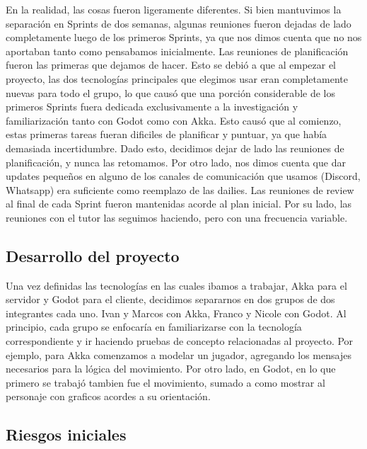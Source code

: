 En la realidad, las cosas fueron ligeramente diferentes. Si bien mantuvimos la separación en Sprints de dos semanas, algunas reuniones
fueron dejadas de lado completamente luego de los primeros Sprints, ya que nos dimos cuenta que no nos aportaban tanto como pensabamos
inicialmente.
Las reuniones de planificación fueron las primeras que dejamos de hacer. Esto se debió a que al empezar el proyecto, las 
dos tecnologías principales que elegimos usar eran completamente nuevas para todo el grupo, lo que causó que una porción considerable de
los primeros Sprints fuera dedicada exclusivamente a la investigación y familiarización tanto con Godot como con Akka. Esto causó que al
comienzo, estas primeras tareas fueran dificiles de planificar y puntuar, ya que había demasiada incertidumbre. Dado esto, decidimos dejar
de lado las reuniones de planificación, y nunca las retomamos.
Por otro lado, nos dimos cuenta que dar updates pequeños en alguno de los canales de comunicación que usamos (Discord, Whatsapp) era suficiente
como reemplazo de las dailies.
Las reuniones de review al final de cada Sprint fueron mantenidas acorde al plan inicial.
Por su lado, las reuniones con el tutor las seguimos haciendo, pero con una frecuencia variable.

\subsection{Desarrollo del proyecto}
Una vez definidas las tecnologías en las cuales ibamos a trabajar, Akka para el servidor y Godot para el cliente, decidimos separarnos
en dos grupos de dos integrantes cada uno. Ivan y Marcos con Akka, Franco y Nicole con Godot. Al principio, cada grupo se enfocaría en 
familiarizarse con la tecnología correspondiente y ir haciendo pruebas de concepto relacionadas al proyecto. Por ejemplo, para Akka 
comenzamos a modelar un jugador, agregando los mensajes necesarios para la lógica del movimiento. Por otro lado, en Godot, en lo que primero
se trabajó tambien fue el movimiento, sumado a como mostrar al personaje con graficos acordes a su orientación.




\subsection{Riesgos iniciales}
